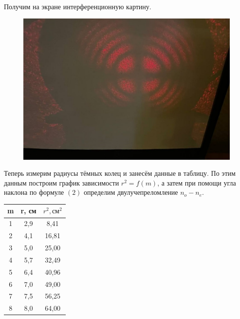 \documentclass[a4paper,12pt]{article}
\begin{document}
Получим на экране интерференционную картину.

\begin{figure}[H]
	\centering
	\includegraphics[scale=1]{photo1.png}
\end{figure}

Теперь измерим радиусы тёмных колец и занесём данные в таблицу. По этим данным построим график зависимости $r^2 = f(m)$, а затем при помощи угла наклона по формуле $(2)$ определим двулучепреломление $n_o - n_e$.

\begin{table}[H]
	\centering
	\begin{tabular}{|c|c|c|}
		\hline
		m & r, см & $r^2, \text{см}^2$ \\ \hline
		1 & 2,9 & 8,41 \\ \hline
		2 & 4,1 & 16,81 \\ \hline
		3 & 5,0 & 25,00 \\ \hline
		4 & 5,7 & 32,49 \\ \hline
		5 & 6,4 & 40,96 \\ \hline
		6 & 7,0 & 49,00 \\ \hline
		7 & 7,5 & 56,25 \\ \hline
		8 & 8,0 & 64,00 \\ \hline
	\end{tabular}
\end{table}
\end{document}
